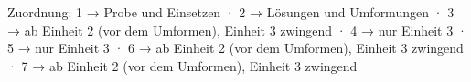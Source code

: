 
Zuordnung: 1 → Probe und Einsetzen · 2 → Lösungen und Umformungen · 3 → ab Einheit 2 (vor dem Umformen), Einheit 3 zwingend · 4 → nur Einheit 3 · 5 → nur Einheit 3 · 6 → ab Einheit 2 (vor dem Umformen), Einheit 3 zwingend · 7 → ab Einheit 2 (vor dem Umformen), Einheit 3 zwingend

